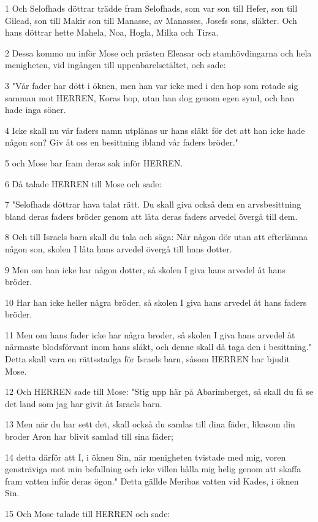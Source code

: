 \par 1 Och Selofhads döttrar trädde fram Selofhads, som var son till Hefer, son till Gilead, son till Makir son till Manasse, av Manasses, Josefs sons, släkter. Och hans döttrar hette Mahela, Noa, Hogla, Milka och Tirsa.
\par 2 Dessa kommo nu inför Mose och prästen Eleasar och stamhövdingarna och hela menigheten, vid ingången till uppenbarelsetältet, och sade:
\par 3 "Vår fader har dött i öknen, men han var icke med i den hop som rotade sig samman mot HERREN, Koras hop, utan han dog genom egen synd, och han hade inga söner.
\par 4 Icke skall nu vår faders namn utplånas ur hans släkt för det att han icke hade någon son? Giv åt oss en besittning ibland vår faders bröder."
\par 5 och Mose bar fram deras sak inför HERREN.
\par 6 Då talade HERREN till Mose och sade:
\par 7 "Selofhads döttrar hava talat rätt. Du skall giva också dem en arvsbesittning bland deras faders bröder genom att låta deras faders arvedel övergå till dem.
\par 8 Och till Israels barn skall du tala och säga: När någon dör utan att efterlämna någon son, skolen I låta hans arvedel övergå till hans dotter.
\par 9 Men om han icke har någon dotter, så skolen I giva hans arvedel åt hans bröder.
\par 10 Har han icke heller några bröder, så skolen I giva hans arvedel åt hans faders bröder.
\par 11 Men om hans fader icke har några broder, så skolen I giva hans arvedel åt närmaste blodsförvant inom hans släkt, och denne skall då taga den i besittning." Detta skall vara en rättsstadga för Israels barn, såsom HERREN har bjudit Mose.
\par 12 Och HERREN sade till Mose: "Stig upp här på Abarimberget, så skall du få se det land som jag har givit åt Israels barn.
\par 13 Men när du har sett det, skall också du samlas till dina fäder, likasom din broder Aron har blivit samlad till sina fäder;
\par 14 detta därför att I, i öknen Sin, när menigheten tvistade med mig, voren gensträviga mot min befallning och icke villen hålla mig helig genom att skaffa fram vatten inför deras ögon." Detta gällde Meribas vatten vid Kades, i öknen Sin.
\par 15 Och Mose talade till HERREN och sade:

